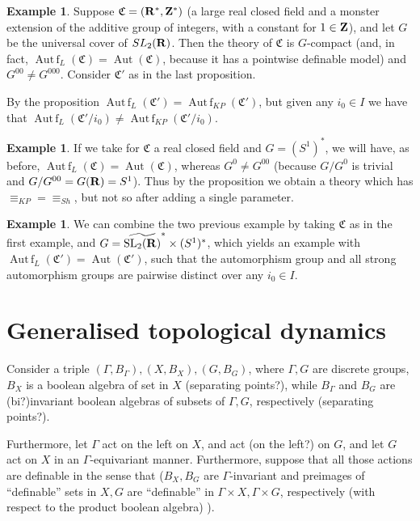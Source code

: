 \documentclass[final,a4paper,12pt]{amsart}
\theoremstyle{remark}
\theoremstyle{definition}
\newtheorem{ex}[thm]{Example}
\DeclareMathOperator{\Aut}{{Aut}}
\DeclareMathOperator{\SL}{{SL}}
\newcommand{\mon}{\mathfrak C}
\newcommand{\Autf}{\operatorname{Aut\,f}}
\let\Gamma\varGamma
\begin{document}
	\begin{ex}
		Suppose $\mon=({\bf R}^*,{\bf Z}^*)$ (a large real closed field and a monster extension of the additive group of integers, with a constant for $1\in {\bf Z}$), and let $G$ be the universal cover of $SL_2({\bf R})$. Then the theory of $\mon$ is $G$-compact (and, in fact, $\Autf_L(\mon)=\Aut(\mon)$, because it has a pointwise definable model)  and  $G^{00}\neq G^{000}$. Consider $\mon'$ as in the last proposition.
		
		By the proposition $\Autf_L(\mon')=\Autf_{KP}(\mon')$, but given any $i_0\in I$ we have that $\Autf_L(\mon'/i_0)\neq \Autf_{KP}(\mon'/i_0)$.
	\end{ex}
	
	\begin{ex}
		If we take for $\mon$ a real closed field and $G=(S^1)^*$, we will have, as before, $\Autf_L(\mon)=\Aut(\mon)$, whereas $G^0\neq G^{00}$ (because $G/G^0$ is trivial and $G/G^{00}=G({\bf R})=S^1$). Thus by the proposition we obtain a theory which has ${\equiv_{KP}}={\equiv_{Sh}}$, but not so after adding a single parameter.
	\end{ex}
	
	\begin{ex}
		We can combine the two previous example by taking $\mon$ as in the first example, and $G=\widetilde{\SL_2({\bf R})}^*\times (S^1)^*$, which yields an example with $\Autf_L(\mon')=\Aut(\mon')$, such that the automorphism group and all strong automorphism groups are pairwise distinct over any $i_0\in I$.
	\end{ex}
	
	\section{Generalised topological dynamics}
	Consider a triple $(\Gamma,B_\Gamma),(X,B_X),(G,B_G)$, where $\Gamma,G$ are discrete groups, $B_X$ is a boolean algebra of set in $X$ (separating points?), while $B_\Gamma$ and $B_G$ are (bi?)invariant boolean algebras of subsets of $\Gamma,G$, respectively (separating points?).
	
	Furthermore, let $\Gamma$ act on the left on $X$, and act (on the left?) on $G$, and let $G$ act on $X$ in an $\Gamma$-equivariant manner. Furthermore, suppose that all those actions are definable in the sense that ($B_X,B_G$ are $\Gamma$-invariant and preimages of ``definable'' sets in $X,G$ are ``definable'' in $\Gamma\times X,\Gamma\times G$, respectively (with respect to the product boolean algebra) ).
	
\end{document}
